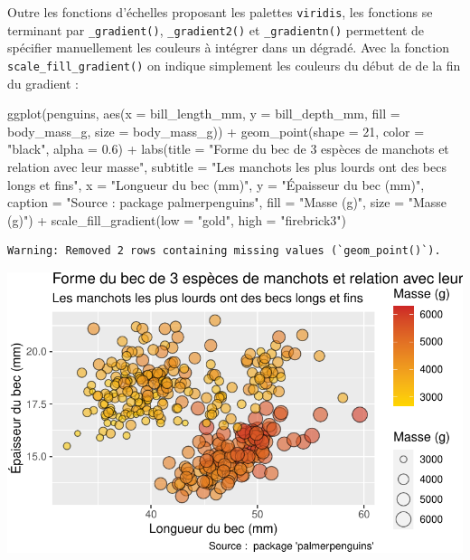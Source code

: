 \documentclass[
  a4paper,
  DIV=11,
  numbers=noendperiod,
  oneside]{scrreprt}
\newenvironment{Shaded}{}{}
\newcommand{\AttributeTok}[1]{\textcolor[rgb]{0.84,0.23,0.29}{#1}}
\newcommand{\DecValTok}[1]{\textcolor[rgb]{0.00,0.36,0.77}{#1}}
\newcommand{\FloatTok}[1]{\textcolor[rgb]{0.00,0.36,0.77}{#1}}
\newcommand{\FunctionTok}[1]{\textcolor[rgb]{0.44,0.26,0.76}{#1}}
\newcommand{\NormalTok}[1]{\textcolor[rgb]{0.14,0.16,0.18}{#1}}
\newcommand{\SpecialCharTok}[1]{\textcolor[rgb]{0.00,0.36,0.77}{#1}}
\newcommand{\StringTok}[1]{\textcolor[rgb]{0.01,0.18,0.38}{#1}}
\begin{document}
Outre les fonctions d'échelles proposant les palettes \texttt{viridis},
les fonctions se terminant par \texttt{\_gradient()},
\texttt{\_gradient2()} et \texttt{\_gradientn()} permettent de spécifier
manuellement les couleurs à intégrer dans un dégradé. Avec la fonction
\texttt{scale\_fill\_gradient()} on indique simplement les couleurs du
début de de la fin du gradient :

\begin{Shaded}
\begin{Highlighting}[]
\FunctionTok{ggplot}\NormalTok{(penguins, }\FunctionTok{aes}\NormalTok{(}\AttributeTok{x =}\NormalTok{ bill\_length\_mm, }\AttributeTok{y =}\NormalTok{ bill\_depth\_mm,}
                     \AttributeTok{fill =}\NormalTok{ body\_mass\_g, }\AttributeTok{size =}\NormalTok{ body\_mass\_g)) }\SpecialCharTok{+}
  \FunctionTok{geom\_point}\NormalTok{(}\AttributeTok{shape =} \DecValTok{21}\NormalTok{, }\AttributeTok{color =} \StringTok{"black"}\NormalTok{, }\AttributeTok{alpha =} \FloatTok{0.6}\NormalTok{) }\SpecialCharTok{+}
  \FunctionTok{labs}\NormalTok{(}\AttributeTok{title =} \StringTok{"Forme du bec de 3 espèces de manchots et relation avec leur masse"}\NormalTok{,}
       \AttributeTok{subtitle =} \StringTok{"Les manchots les plus lourds ont des becs longs et fins"}\NormalTok{,}
       \AttributeTok{x =} \StringTok{"Longueur du bec (mm)"}\NormalTok{,}
       \AttributeTok{y =} \StringTok{"Épaisseur du bec (mm)"}\NormalTok{,}
       \AttributeTok{caption =} \StringTok{"Source :  package \textquotesingle{}palmerpenguins\textquotesingle{}"}\NormalTok{,}
       \AttributeTok{fill =} \StringTok{"Masse (g)"}\NormalTok{,}
       \AttributeTok{size =} \StringTok{"Masse (g)"}\NormalTok{) }\SpecialCharTok{+}
  \FunctionTok{scale\_fill\_gradient}\NormalTok{(}\AttributeTok{low =} \StringTok{"gold"}\NormalTok{, }\AttributeTok{high =} \StringTok{"firebrick3"}\NormalTok{)}
\end{Highlighting}
\end{Shaded}

\begin{verbatim}
Warning: Removed 2 rows containing missing values (`geom_point()`).
\end{verbatim}

\includegraphics{03-visualization_files/figure-pdf/unnamed-chunk-95-1.pdf}
\end{document}
